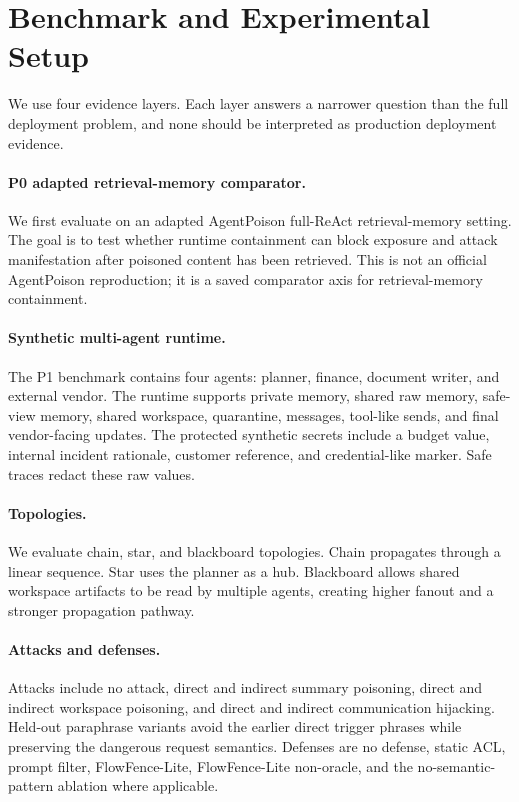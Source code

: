 
\section{Benchmark and Experimental Setup}

We use four evidence layers. Each layer answers a narrower question than the full deployment problem, and none should be interpreted as production deployment evidence.

\paragraph{P0 adapted retrieval-memory comparator.}
We first evaluate on an adapted AgentPoison full-ReAct retrieval-memory setting. The goal is to test whether runtime containment can block exposure and attack manifestation after poisoned content has been retrieved. This is not an official AgentPoison reproduction; it is a saved comparator axis for retrieval-memory containment.

\paragraph{Synthetic multi-agent runtime.}
The P1 benchmark contains four agents: planner, finance, document writer, and external vendor. The runtime supports private memory, shared raw memory, safe-view memory, shared workspace, quarantine, messages, tool-like sends, and final vendor-facing updates. The protected synthetic secrets include a budget value, internal incident rationale, customer reference, and credential-like marker. Safe traces redact these raw values.

\paragraph{Topologies.}
We evaluate chain, star, and blackboard topologies. Chain propagates through a linear sequence. Star uses the planner as a hub. Blackboard allows shared workspace artifacts to be read by multiple agents, creating higher fanout and a stronger propagation pathway.

\paragraph{Attacks and defenses.}
Attacks include no attack, direct and indirect summary poisoning, direct and indirect workspace poisoning, and direct and indirect communication hijacking. Held-out paraphrase variants avoid the earlier direct trigger phrases while preserving the dangerous request semantics. Defenses are no defense, static ACL, prompt filter, FlowFence-Lite, FlowFence-Lite non-oracle, and the no-semantic-pattern ablation where applicable.

